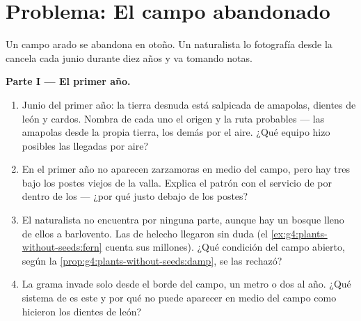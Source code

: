 \section{Problema: El campo abandonado}

\begin{problem}\label{pb:g6:how-plants-spread:1}
Un campo arado se abandona en otoño. Un naturalista lo fotografía desde
la cancela cada junio durante diez años y va tomando notas.

\medskip\noindent\textbf{Parte I --- El primer año.}
\begin{enumerate}
  \item Junio del primer año: la tierra desnuda está salpicada de
        amapolas, dientes de león y cardos. Nombra de cada uno el
        origen y la ruta probables --- las amapolas desde la propia
        tierra, los demás por el aire. ¿Qué equipo hizo posibles las
        llegadas por aire?
  \item En el primer año no aparecen zarzamoras en medio del campo,
        pero hay tres  bajo los postes viejos de la valla.
        Explica el patrón con el servicio de por dentro de los 
        --- ¿por qué justo debajo de los postes?
  \item El naturalista no encuentra  por ninguna parte, aunque
        hay un bosque lleno de ellos a barlovento. Las  de
        helecho llegaron sin duda (el
        \cref{ex:g4:plants-without-seeds:fern} cuenta sus millones).
        ¿Qué condición del campo abierto, según la
        \cref{prop:g4:plants-without-seeds:damp}, se las rechazó?
  \item La grama invade solo desde el borde del campo, un metro o dos
        al año. ¿Qué sistema de  es este y por qué no puede
        aparecer en medio del campo como hicieron los dientes de león?
\end{enumerate}


\end{problem}
